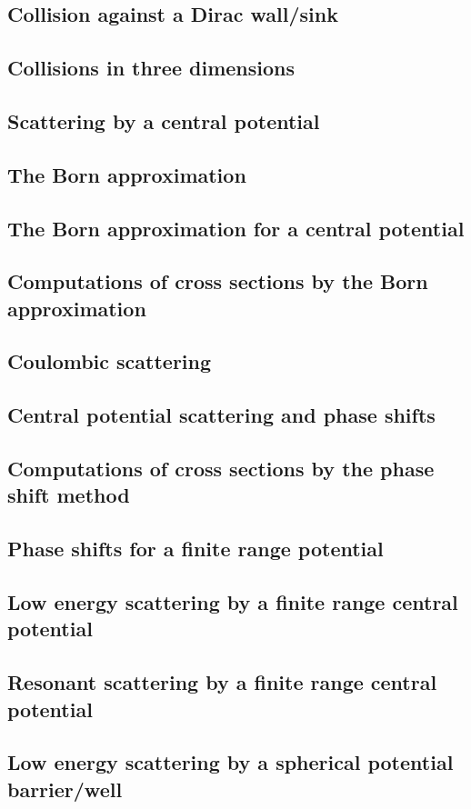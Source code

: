 \documentclass{article}
\begin{document}
\subsection{Collision against a Dirac wall/sink}
\subsection{Collisions in three dimensions}
\subsection{Scattering by a central potential}
\subsection{The Born approximation}
\subsection{The Born approximation for a central potential}
\subsection{Computations of cross sections by the Born approximation}
\subsection{Coulombic scattering}
\subsection{Central potential scattering and phase shifts}
\subsection{Computations of cross sections by the phase shift method}
\subsection{Phase shifts for a finite range potential}
\subsection{Low energy scattering by a finite range central potential}
\subsection{Resonant scattering by a finite range central potential}
\subsection{Low energy scattering by a spherical potential barrier/well}
\end{document}
